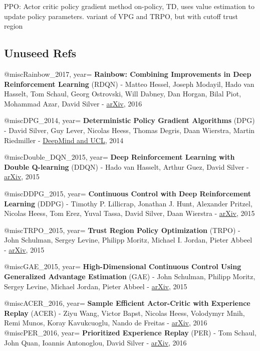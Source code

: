 PPO:
Actor critic policy gradient method
on-policy, TD, uses value estimation to update policy parameters.
variant of VPG and TRPO, but with cutoff trust region



 
 
 
 
 
 \subsection{Unuseed Refs}

 

@misc{Rainbow_2017, 
    year={
    \textbf{Rainbow: Combining Improvements in Deep Reinforcement Learning} (RDQN)
    - Matteo Hessel, Joseph Modayil, Hado van Hasselt, Tom Schaul, Georg Ostrovski, Will Dabney, Dan Horgan, Bilal Piot, Mohammad Azar, David Silver -
     \href{https://arxiv.org/abs/1710.02298}{arXiv},
    2016}
}
 
 
 
 @misc{DPG_2014, 
    year={
    \textbf{Deterministic Policy Gradient Algorithms} (DPG)
    - David Silver, Guy Lever, Nicolas Heess, Thomas Degris, Daan Wierstra, Martin Riedmiller -
     \href{http://proceedings.mlr.press/v32/silver14.pdf}{DeepMind and UCL},
    2014}
}

@misc{Double_DQN_2015, 
    year={
    \textbf{Deep Reinforcement Learning with Double Q-learning} (DDQN)
    - Hado van Hasselt, Arthur Guez, David Silver -
     \href{https://arxiv.org/abs/1509.06461}{arXiv},
    2015}
}

@misc{DDPG_2015, 
    year={
    \textbf{Continuous Control with Deep Reinforcement Learning} (DDPG)
    - Timothy P. Lillicrap, Jonathan J. Hunt, Alexander Pritzel, Nicolas Heess, Tom Erez, Yuval Tassa, David Silver, Daan Wierstra -
     \href{https://arxiv.org/abs/1509.02971}{arXiv},
    2015}
}

@misc{TRPO_2015, 
    year={
    \textbf{Trust Region Policy Optimization} (TRPO)
    - John Schulman, Sergey Levine, Philipp Moritz, Michael I. Jordan, Pieter Abbeel -
     \href{https://arxiv.org/abs/1502.05477}{arXiv},
    2015}
}

@misc{GAE_2015, 
    year={
    \textbf{High-Dimensional Continuous Control Using Generalized Advantage Estimation} (GAE)
    - John Schulman, Philipp Moritz, Sergey Levine, Michael Jordan, Pieter Abbeel -
     \href{https://arxiv.org/abs/1506.02438}{arXiv},
    2015}
}

@misc{ACER_2016, 
    year={
    \textbf{Sample Efficient Actor-Critic with Experience Replay} (ACER)
    - Ziyu Wang, Victor Bapst, Nicolas Heess, Volodymyr Mnih, Remi Munos, Koray Kavukcuoglu, Nando de Freitas -
     \href{https://arxiv.org/abs/1611.01224}{arXiv},
    2016}
}
@misc{PER_2016, 
    year={
    \textbf{Prioritized Experience Replay} (PER)
    - Tom Schaul, John Quan, Ioannis Antonoglou, David Silver -
     \href{https://arxiv.org/abs/1511.05952}{arXiv},
    2016}
}

